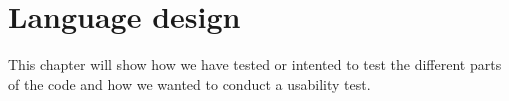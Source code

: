 \chapter{Language design}\label{cha:languagedesign}
This chapter will show how we have tested or intented to test the different parts of the code and how we wanted to conduct a usability test.



